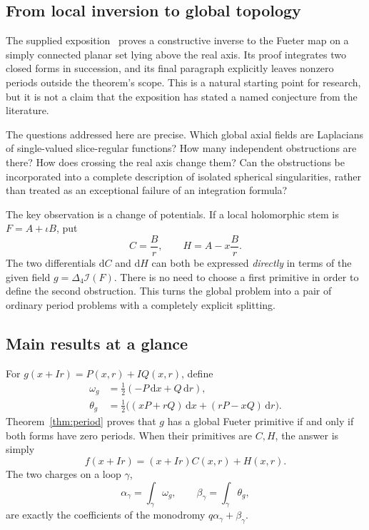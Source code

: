 \documentclass[11pt,a4paper]{article}
\numberwithin{equation}{section}
\theoremstyle{definition}
\theoremstyle{remark}
\newcommand{\Lap}{\Delta_4}
\newcommand{\ind}{\mathcal I}
\newcommand{\dx}{\,\mathrm dx}
\newcommand{\dr}{\,\mathrm dr}
\begin{document}
\subsection{From local inversion to global topology}
The supplied exposition~\cite{Source} proves a constructive inverse to the
Fueter map on a simply connected planar set lying above the real axis.
Its proof integrates two closed forms in succession, and its final
paragraph explicitly leaves nonzero periods outside the theorem's scope.
This is a natural starting point for research, but it is not a claim that
the exposition has stated a named conjecture from the literature.

The questions addressed here are precise. Which global axial fields are
Laplacians of single-valued slice-regular functions? How many independent
obstructions are there? How does crossing the real axis change them?
Can the obstructions be incorporated into a complete description of
isolated spherical singularities, rather than treated as an exceptional
failure of an integration formula?

The key observation is a change of potentials. If a local holomorphic
stem is $F=A+\iota B$, put
\[
 C=\frac Br,\qquad H=A-x\frac Br.
\]
The two differentials $\mathrm dC$ and $\mathrm dH$ can both be expressed
\emph{directly} in terms of the given field $g=\Lap\ind(F)$.
There is no need to choose a first primitive in order to define the second
obstruction. This turns the global problem into a pair of ordinary period
problems with a completely explicit splitting.

\subsection{Main results at a glance}
For $g(x+Ir)=P(x,r)+IQ(x,r)$, define
\begin{align}
 \omega_g&=\frac12(-P\dx+Q\dr),\label{eq:omega-intro}\\
 \theta_g&=\frac12\bigl((xP+rQ)\dx+(rP-xQ)\dr\bigr).
 \label{eq:theta-intro}
\end{align}
Theorem~\ref{thm:period} proves that $g$ has a global Fueter primitive
if and only if both forms have zero periods. When their primitives are
$C,H$, the answer is simply
\begin{equation}
 f(x+Ir)=(x+Ir)C(x,r)+H(x,r).
 \label{eq:reconstruction-intro}
\end{equation}
The two charges on a loop $\gamma$,
\[
 \alpha_\gamma=\int_\gamma\omega_g,\qquad
 \beta_\gamma=\int_\gamma\theta_g,
\]
are exactly the coefficients of the monodromy $q\alpha_\gamma+\beta_\gamma$.
\end{document}
